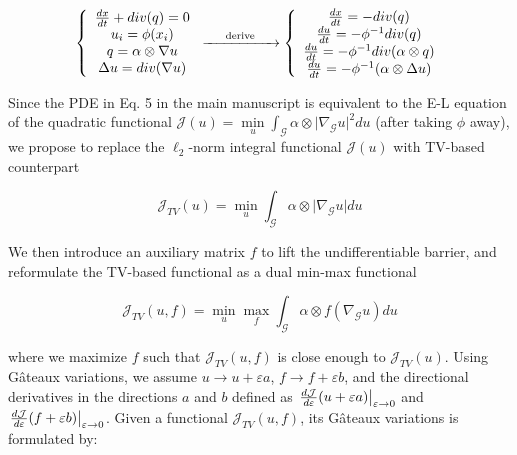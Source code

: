 \documentclass{article}
\begin{document}
\begin{equation}
\label{eqs14}
\left\{ {\begin{array}{*{20}{c}}
{\frac{{dx}}{{dt}} + div(q) = 0}\\
{{u_i} = \phi ({x_i})}\\
{q = \alpha  \otimes \nabla u}\\
{\Delta u = div(\nabla u)}
\end{array}} \right. \xrightarrow{\hspace*{0.5cm}\text{derive}\hspace*{0.5cm}}\left\{ {\begin{array}{*{20}{c}}
{\frac{{dx}}{{dt}} =  - div(q)}\\
{\frac{{du}}{{dt}} =  - {\phi ^{ - 1}}div(q)}\\
{\frac{{du}}{{dt}} =  - {\phi ^{ - 1}}div(\alpha  \otimes q)}\\
{\frac{{du}}{{dt}} =  - {\phi ^{ - 1}}(\alpha  \otimes \Delta u)}
\end{array}} \right.
\end{equation}

Since the PDE in Eq. 5 in the main manuscript is equivalent to the E-L equation of the quadratic functional $\mathcal{J}(u)= \mathop {\min }\limits_u \int_\mathcal{G}  \alpha \otimes | \nabla_{\mathcal{G}} u{|^2}du$ (after taking $\phi$ away), we propose to replace the ${\ell _2}$-norm integral functional $\mathcal{J}(u)$ with TV-based counterpart

\begin{equation}
\mathcal{J}_{TV}(u)=\mathop {\min }\limits_u \int_\mathcal{G} \alpha \otimes | \nabla_{\mathcal{G}} u{|}du
\end{equation}

We then introduce an auxiliary matrix $f$ to lift the undifferentiable barrier, and reformulate the TV-based functional as a dual min-max functional

\begin{equation}
\mathcal{J}_{TV}(u,f)=\mathop {\min }\limits_{u} \mathop {\max}\limits_{f} \int_\mathcal{G} \alpha \otimes f (\nabla_{\mathcal{G}} u) du
\end{equation}

where we maximize $f$ such that $\mathcal{J}_{TV}(u,f)$ is close enough to $\mathcal{J}_{TV}(u)$. Using Gâteaux variations, we assume
$u \to u + \varepsilon a$, $f \to f + \varepsilon b$, and the directional derivatives in the directions $a$ and $b$ defined as ${\left. {\frac{{d{\cal J}}}{{d\varepsilon }}(u + \varepsilon a)} \right|_{\varepsilon  \to 0}}$ and ${\left. {\frac{{d {\cal J}}}{{d\varepsilon }}(f + \varepsilon b)} \right|_{\varepsilon  \to 0}}$. Given a functional $\mathcal{J}_{TV}(u,f)$, its Gâteaux variations is formulated by:
\end{document}
